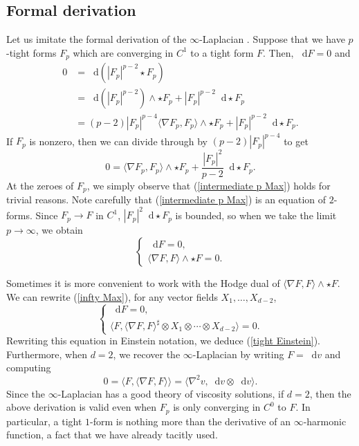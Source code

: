 \documentclass[reqno,11pt]{amsart}
\newcommand*\dif{\mathop{}\!\mathrm{d}}
\theoremstyle{definition}
\numberwithin{equation}{section}
\begin{document}
\subsection{Formal derivation}
Let us imitate the formal derivation of the $\infty$-Laplacian \cite{Aronsson67}.
Suppose that we have $p$-tight forms $F_p$ which are converging in $C^1$ to a tight form $F$.
Then, $\dif F = 0$ and
\begin{align*}
0
&= \dif(|F_p|^{p - 2} \star F_p) \\
&= \dif(|F_p|^{p - 2}) \wedge \star F_p + |F_p|^{p - 2} \dif \star F_p \\
&= (p - 2) |F_p|^{p - 4} \langle \nabla F_p, F_p\rangle \wedge \star F_p + |F_p|^{p - 2} \dif \star F_p.
\end{align*}
If $F_p$ is nonzero, then we can divide through by $(p - 2) |F_p|^{p - 4}$ to get
\begin{equation}\label{intermediate p Max}
0 = \langle\nabla F_p, F_p\rangle \wedge \star F_p + \frac{|F_p|^2}{p - 2} \dif \star F_p.
\end{equation}
At the zeroes of $F_p$, we simply observe that (\ref{intermediate p Max}) holds for trivial reasons.
Note carefully that (\ref{intermediate p Max}) is an equation of $2$-forms.
Since $F_p \to F$ in $C^1$, $|F_p|^2 \dif \star F_p$ is bounded, so when we take the limit $p \to \infty$, we obtain 
\begin{equation}\label{infty Max}
\begin{cases}
\dif F = 0, \\
\langle \nabla F, F\rangle \wedge \star F = 0.
\end{cases}
\end{equation}

Sometimes it is more convenient to work with the Hodge dual of $\langle \nabla F, F\rangle \wedge \star F$.
We can rewrite (\ref{infty Max}), for any vector fields $X_1, \dots, X_{d - 2}$,
\begin{equation}\label{dual infty Max}
\begin{cases}
\dif F = 0, \\
\langle F, \langle \nabla F, F\rangle^\sharp \otimes X_1 \otimes \cdots \otimes X_{d - 2}\rangle = 0.
\end{cases}
\end{equation}
Rewriting this equation in Einstein notation, we deduce (\ref{tight Einstein}).
Furthermore, when $d = 2$, we recover the $\infty$-Laplacian by writing $F = \dif v$ and computing 
$$0 = \langle F, \langle \nabla F, F\rangle\rangle = \langle \nabla^2 v, \dif v \otimes \dif v\rangle.$$
Since the $\infty$-Laplacian has a good theory of viscosity solutions, if $d = 2$, then the above derivation is valid even when $F_p$ is only converging in $C^0$ to $F$.
In particular, a tight $1$-form is nothing more than the derivative of an $\infty$-harmonic function, a fact that we have already tacitly used.
\end{document}
